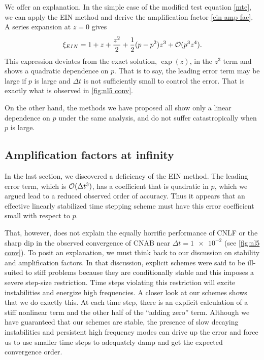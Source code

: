 We offer an explanation. In the simple case of the modified test equation \cref{mte}, we can apply the EIN method and derive the amplification factor \cref{ein amp fac}. A series expansion at $z=0$ gives 
\begin{align}
        \xi_{EIN}
= 1 + z + \frac{z^2}{2} + \frac{1}{2}(p-p^2)z^3 + \mathcal{O}(p^3z^4).
\end{align}
This expression deviates from the exact solution, $\exp(z)$, in the $z^3$ term  and shows a quadratic dependence on $p$. That is to say, the leading error term may be large if $p$ is large and $\Delta t$ is not sufficiently small to control the error. That is exactly what is observed in \cref{fig:nl5 conv}.

On the other hand, the methods we have proposed all show only a linear dependence on $p$ under the same analysis, and do not suffer catastropically when $p$ is large.

\subsection{Amplification factors at infinity}
In the last section, we discovered a deficiency of the EIN method. The leading error term, which is $\mathcal{O}(\Delta t^3)$, has a coefficient that is quadratic in $p$, which we argued lead to a reduced observed order of accuracy. Thus it appears that an effective linearly stabilized time stepping scheme must have this error coefficient small with respect to $p$. 

That, however, does not explain the equally horrific performance of CNLF or the sharp dip in the observed convergence of CNAB  near $\Delta t = \num{1e-2}$ (see \cref{fig:nl5 conv}). To posit an explanation, we must think back to our discussion on stability and amplification factors. In that discussion, explicit schemes were said to be ill-suited to stiff problems because they are conditionally stable and this imposes a severe step-size restriction. Time steps violating this restriction will excite instabilities and energize high frequencies. A closer look at our schemes shows that we do exactly this. At each time step, there is an explicit calculation of a stiff nonlinear term and the other half of the ``adding zero'' term. Although we have guaranteed that our schemes are stable, the presence of slow decaying instabilities and persistent high frequency modes can drive up the error and force us to use smaller time steps to adequately damp and get the expected convergence order.

